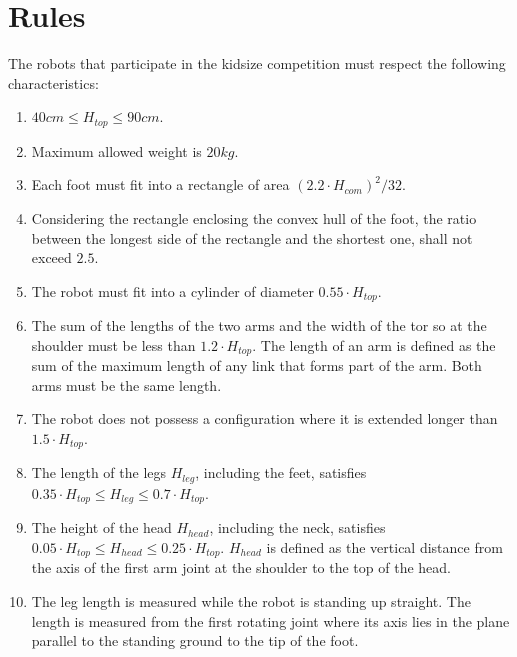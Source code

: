 \chapter{Rules}
The robots that participate in the kidsize competition must respect the following characteristics\cite{robocup_rules}:\begin{enumerate}
\item $40cm \leq H_{top} \leq 90cm$.

\item Maximum allowed weight is $20kg$.

\item Each foot must fit into a rectangle of area
$(2.2 \cdot H_{com})^2/32$.

\item Considering the rectangle enclosing the convex hull of the foot, the ratio between the longest side of the rectangle and the shortest one, shall not exceed $2.5$.

\item The robot must fit into a cylinder of diameter $0.55 \cdot H_{top}$.

\item The sum of the lengths of the two arms and the width of the tor
so at the shoulder must be less than $1.2\cdot H_{top}$. The length of an arm is defined as the sum of the maximum length of any link that forms part of the arm. Both arms must be the same length.

\item The robot does not possess a configuration where it is extended longer than $1.5 \cdot H_{top}$.

\item The length of the legs $H_{leg}$, including the feet, satisfies $0.35 \cdot H_{top} \leq H_{leg} \leq 0.7 \cdot H_{top}$.

\item The height of the head $H_{head}$, including the neck, satisfies $0.05 \cdot H_{top} \leq H_{head} \leq 0.25 \cdot H_{top}$. $H_{head}$ is defined as the vertical distance from the axis of the first arm
joint at the shoulder to the top of the head.

\item The leg length is measured while the robot is standing up straight. The length is measured from the first rotating joint where its axis lies in the plane parallel to the standing ground to the tip of the foot.
\end{enumerate}

